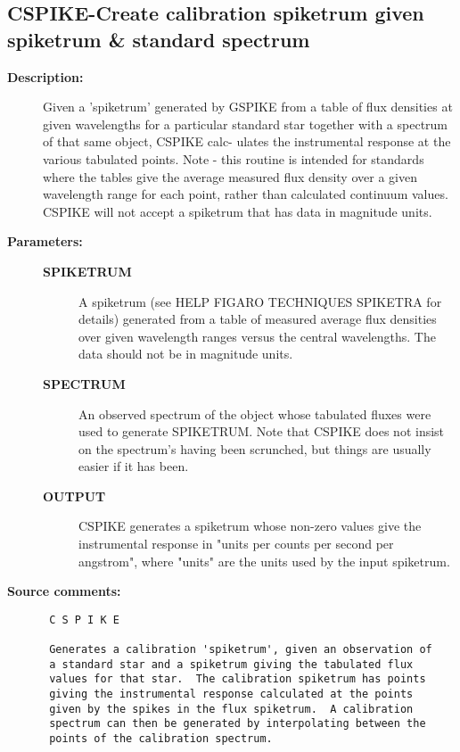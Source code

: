 \subsection{CSPIKE-\label{CSPIKE}Create calibration spiketrum given spiketrum & standard spectrum}
\begin{description}

\item [{\bf Description:}]
 Given a 'spiketrum' generated by GSPIKE from a table of flux
 densities at given wavelengths for a particular standard star
 together with a spectrum of that same object, CSPIKE calc-
 ulates the instrumental response at the various tabulated
 points.  Note - this routine is intended for standards where
 the tables give the average measured flux density over a
 given wavelength range for each point, rather than calculated
 continuum values.  CSPIKE will not accept a spiketrum that
 has data in magnitude units.

\item [{\bf Parameters:}]
\begin{description}
\item [{\bf SPIKETRUM}]
 A spiketrum (see HELP FIGARO TECHNIQUES SPIKETRA for
 details) generated from a table of measured average
 flux densities over given wavelength ranges versus
 the central wavelengths.  The data should not be in
 magnitude units.
\item [{\bf SPECTRUM}]
 An observed spectrum of the object whose tabulated
 fluxes were used to generate SPIKETRUM.  Note that
 CSPIKE does not insist on the spectrum's having been
 scrunched, but things are usually easier if it has been.
\item [{\bf OUTPUT}]
 CSPIKE generates a spiketrum whose non-zero values
 give the instrumental response in "units per counts
 per second per angstrom", where "units" are the
 units used by the input spiketrum.
\end{description}

\item [{\bf Source comments:}]
\begin{verbatim}
 C S P I K E

 Generates a calibration 'spiketrum', given an observation of
 a standard star and a spiketrum giving the tabulated flux
 values for that star.  The calibration spiketrum has points
 giving the instrumental response calculated at the points
 given by the spikes in the flux spiketrum.  A calibration
 spectrum can then be generated by interpolating between the
 points of the calibration spectrum.


\end{verbatim}
\end{description}

